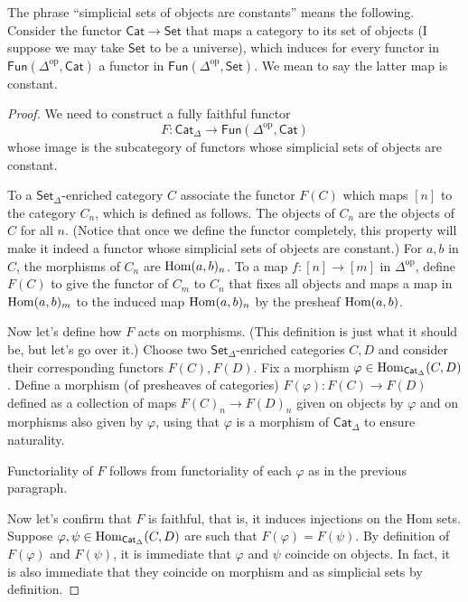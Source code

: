 \begin{remark}
\label{remark-induced-functor-on-objects}
The phrase ``simplicial sets of objects are
constants''
means the following. Consider the functor
$\mathsf{Cat} \to \mathsf{Set}$ that maps a
category to its set
of objects (I suppose we may take
$\mathsf{Set}$ to be a universe),
which induces for every functor in
$\mathsf{Fun}(\Delta^{\text{op}},\mathsf{Cat}
)$
a functor in
$\mathsf{Fun}(\Delta^{\text{op}},\mathsf{Set}
)$.
We mean to say the latter map is constant.
\end{remark}

\begin{proof}
We need to construct a fully faithful functor
$$
F:\mathsf{Cat}_\Delta \to
\mathsf{Fun}(\Delta^{\text{op}},\mathsf{Cat})
$$
whose image is the subcategory of functors
whose simplicial sets of objects are
constant.

To a $\mathsf{Set}_\Delta$-enriched category
$C$
associate the functor $F(C)$ which maps $[n]$
to the category $C_n$, which is defined as
follows.
The objects of $C_n$ are the objects of $C$
for all $n$.
(Notice that once we define the functor
completely,
this property will make it indeed a functor
whose simplicial
sets of objects are constant.)
For $a,b$ in $C$, the morphisms of $C_n$
are $\mathop{\mathrm{Hom}}\nolimits(a,b)_n$. To a map $f:[n] \to [m]$
in $\Delta^{\text{op}}$,
define $F(C)$ to give the functor of $C_m$ to
$C_n$ that fixes
all objects and maps a map in $\mathop{\mathrm{Hom}}\nolimits(a,b)_m$
to the induced map $\mathop{\mathrm{Hom}}\nolimits(a,b)_n$ by the
presheaf
$\mathop{\mathrm{Hom}}\nolimits(a,b)$.

Now let's define how $F$ acts on morphisms.
(This definition is just what it should be,
but let's go over it.)
Choose two
$\mathsf{Set}_\Delta$-enriched categories
$C,D$
and consider their corresponding functors
$F(C),F(D)$.
Fix a morphism $\varphi \in
\mathop{\mathrm{Hom}}\nolimits_{\mathsf{Cat}_\Delta}(C,D)$.
Define a morphism (of presheaves of
categories)
$F(\varphi):F(C) \to F(D)$
defined as a collection of maps $F(C)_n \to
F(D)_n$
given on objects by $\varphi$ and on
morphisms
also given by $\varphi$, using that $\varphi$
is a morphism
of $\mathsf{Cat}_\Delta$ to ensure
naturality.

Functoriality of $F$ follows from
functoriality of each $\varphi$ as in the
previous paragraph.

Now let's confirm that $F$ is faithful, that
is, it induces injections
on the Hom sets. Suppose $\varphi,\psi \in
\mathop{\mathrm{Hom}}\nolimits_{\mathsf{Cat}_\Delta}(C,D)$
are such that $F(\varphi)=F(\psi)$. By
definition of $F(\varphi)$ and
 $F(\psi)$, it is immediate that $\varphi$
 and $\psi$ coincide on objects.
In fact, it is also immediate that they
coincide on morphism and as
simplicial sets by definition.


\end{proof}
